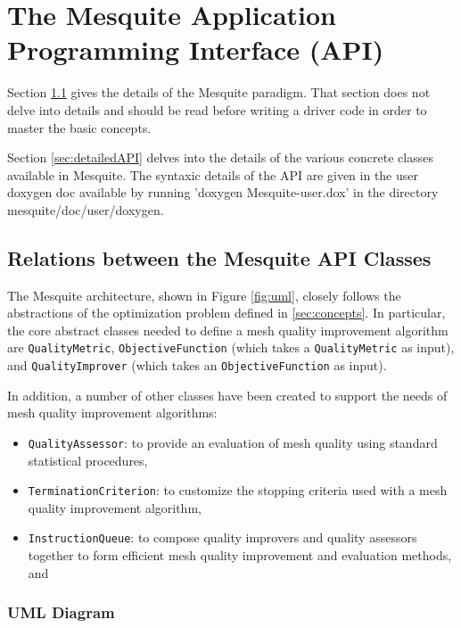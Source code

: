 \chapter{The Mesquite Application Programming Interface (API)} \label{sec:API}

Section \ref{sec:classesRelations} gives the details of the Mesquite paradigm. That section does not
delve into details and should be read before writing a driver code in order to master the basic
concepts. 

Section \ref{sec:detailedAPI} delves into the details of the various concrete classes available in
Mesquite. The syntaxic details of the API are given in the user doxygen doc available by running
'doxygen Mesquite-user.dox' in the directory mesquite/doc/user/doxygen. 

\section{Relations between the Mesquite API Classes} \label{sec:classesRelations}

The Mesquite architecture, shown in Figure \ref{fig:uml}, closely
follows the abstractions of the optimization problem defined in \ref{sec:concepts}.
In particular, the core abstract classes needed to
define a mesh quality improvement algorithm are {\tt QualityMetric},
{\tt ObjectiveFunction} (which takes a {\tt QualityMetric} as
input), and {\tt QualityImprover} (which takes an {\tt ObjectiveFunction}
as input).

In addition, a number of other classes have been created to support
the needs of mesh quality improvement algorithms:
\begin{itemize}
\item {\tt QualityAssessor}: to provide an evaluation of mesh
quality using standard statistical procedures,
\item {\tt TerminationCriterion}: to customize the stopping criteria
used with a mesh quality improvement algorithm,
\item {\tt InstructionQueue}: to compose quality improvers and
quality assessors together to form efficient mesh quality improvement
and evaluation methods, and
\end{itemize}

\subsection{UML Diagram}


